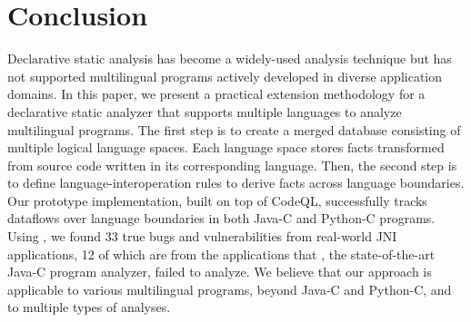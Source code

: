 \section{Conclusion}\label{sec:conclude}
Declarative static analysis has become a widely-used analysis technique but
has not supported multilingual programs actively developed in diverse
application domains.
In this paper, we present a practical extension methodology for a declarative static
analyzer that supports multiple languages to analyze multilingual programs.
The first step is to create a merged database consisting of multiple logical language
spaces. Each language space stores facts transformed from source code written in its
corresponding language.
Then, the second step is to define language-interoperation rules to derive facts
across language boundaries.
Our prototype implementation, \ours built on top of CodeQL, successfully tracks dataflows
over language boundaries in both Java-C and Python-C programs.
Using \ours, we found 33 true bugs and vulnerabilities from real-world
JNI applications, 12 of which are from the applications that \lees,
the state-of-the-art Java-C program analyzer, failed to analyze.
We believe that our approach is applicable to various multilingual programs,
beyond Java-C and Python-C, and to multiple types of analyses.

